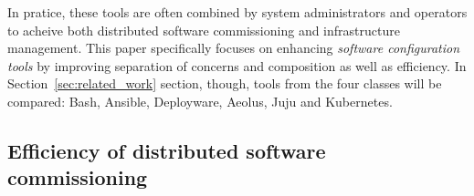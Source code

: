 In pratice, these tools are often combined by system administrators
and operators to acheive both distributed software commissioning and
infrastructure management. This paper specifically focuses on
enhancing \emph{software configuration tools} by improving separation
of concerns and composition as well as efficiency. In
Section~\ref{sec:related_work} section, though, tools from the four
classes will be compared: Bash, Ansible, Deployware, Aeolus, Juju and
Kubernetes.

\subsection{Efficiency of distributed software commissioning}

